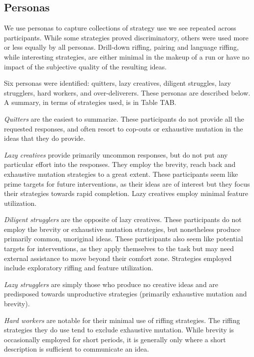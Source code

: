\subsection{Personas}

We use personas to capture collections of strategy use we see repeated across participants. While some strategies proved discriminatory, others were used more or less equally by all personas. Drill-down riffing, pairing and language riffing, while interesting strategies, are either minimal in the makeup of a run or have no impact of the subjective quality of the resulting ideas.

Six personas were identified: quitters, lazy creatives, diligent struggles, lazy strugglers, hard workers, and over-deliverers. These personas are described below. A summary, in terms of strategies used, is in Table TAB.

\emph{Quitters} are the easiest to summarize. These participants do not provide all the requested responses, and often resort to cop-outs or exhaustive mutation in the ideas that they do provide.

\emph{Lazy creatives} provide primarily uncommon responses, but do not put any particular effort into the responses. They employ the brevity, reach back and exhaustive mutation strategies to a great extent. These participants seem like prime targets for future interventions, as their ideas are of interest but they focus their strategies towards rapid completion. Lazy creatives employ minimal feature utilization.

\emph{Diligent strugglers} are the opposite of lazy creatives. These participants do not employ the brevity or exhaustive mutation strategies, but nonetheless produce primarily common, unoriginal ideas. These participants also seem like potential targets for interventions, as they apply themselves to the task but may need external assistance to move beyond their comfort zone. Strategies employed include exploratory riffing and feature utilization.

\emph{Lazy strugglers} are simply those who produce no creative ideas and are predisposed towards unproductive strategies (primarily exhaustive mutation and brevity).

\emph{Hard workers} are notable for their minimal use of riffing strategies. The riffing strategies they do use tend to exclude exhaustive mutation. While brevity is occasionally employed for short periods, it is generally only where a short description is sufficient to communicate an idea.

